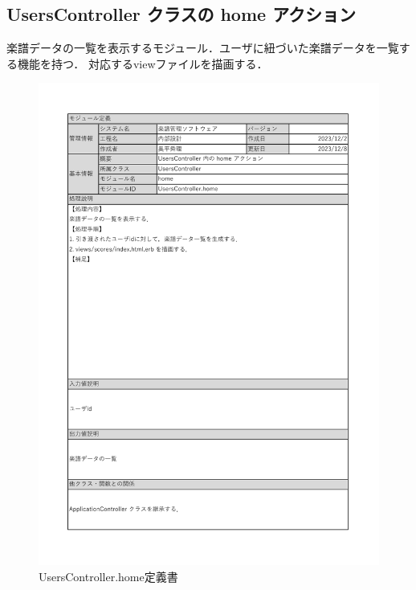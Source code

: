 \subsection*{UsersController クラスの home アクション}
楽譜データの一覧を表示するモジュール．ユーザに紐づいた楽譜データを一覧する機能を持つ．
対応するviewファイルを描画する．
\begin{figure}[H]
	\centering
	\includegraphics[scale=0.6]{img/Users/xlsx/UsersController_home.pdf}
	\vspace{-1cm}
	\caption{UsersController.home定義書}
\end{figure}
